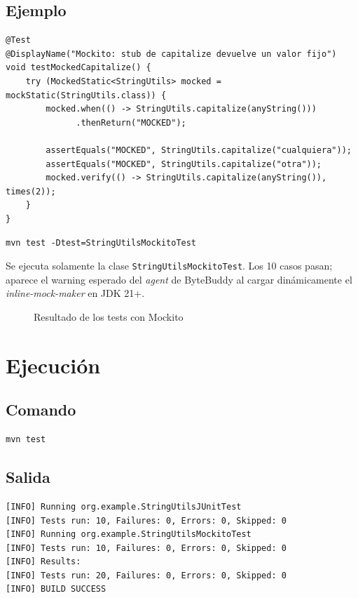 \documentclass{article}
\begin{document}
\subsection{Ejemplo}
\begin{verbatim}
@Test
@DisplayName("Mockito: stub de capitalize devuelve un valor fijo")
void testMockedCapitalize() {
    try (MockedStatic<StringUtils> mocked = mockStatic(StringUtils.class)) {
        mocked.when(() -> StringUtils.capitalize(anyString()))
              .thenReturn("MOCKED");

        assertEquals("MOCKED", StringUtils.capitalize("cualquiera"));
        assertEquals("MOCKED", StringUtils.capitalize("otra"));
        mocked.verify(() -> StringUtils.capitalize(anyString()), times(2));
    }
}
\end{verbatim}

\begin{verbatim}
mvn test -Dtest=StringUtilsMockitoTest
\end{verbatim}

Se ejecuta solamente la clase \texttt{StringUtilsMockitoTest}. Los 10 casos pasan; aparece el warning esperado del \textit{agent} de ByteBuddy al cargar din\'amicamente el \textit{inline-mock-maker} en JDK 21+.

\begin{figure}[H]
\centering
\caption{Resultado de los tests con Mockito}
\end{figure}

\newpage
\section{Ejecuci\'on}

\subsection{Comando}
\begin{verbatim}
mvn test
\end{verbatim}

\subsection{Salida}
\begin{verbatim}
[INFO] Running org.example.StringUtilsJUnitTest
[INFO] Tests run: 10, Failures: 0, Errors: 0, Skipped: 0
[INFO] Running org.example.StringUtilsMockitoTest
[INFO] Tests run: 10, Failures: 0, Errors: 0, Skipped: 0
[INFO] Results:
[INFO] Tests run: 20, Failures: 0, Errors: 0, Skipped: 0
[INFO] BUILD SUCCESS
\end{verbatim}
\end{document}
